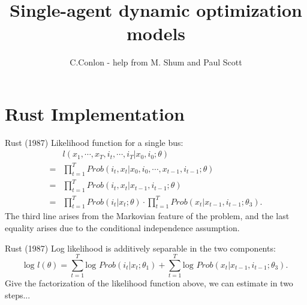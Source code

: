 \documentclass[xcolor=pdftex,dvipsnames,table,mathserif,aspectratio=169]{beamer}
\title [Single-agent dynamic optimization models]{Single-agent dynamic optimization models}
\author{C.Conlon - help from M. Shum and Paul Scott}
\institute{Grad IO }
\date{}
\begin{document}
\begin{frame}
\titlepage
\end{frame}

\section{Rust Implementation}

\begin{frame}{Rust (1987)}
Likelihood function for a single bus:
\begin{equation*}
\begin{split}
& l (x_1, \cdots , x_T, i_t, \cdots , i_T | x_0, i_0 ; \theta) \\
= & \prod^T_{t=1} Prob (i_t, x_t | x_0, i_0, \cdots , x_{t-1}, i_{t-1} ; \theta) \\
= & \prod^T_{t=1} Prob (i_t, x_t |  x_{t-1}, i_{t-1} ; \theta) \\
= & \prod^T_{t=1} Prob (i_t | x_t; \theta) \cdot \prod^T_{t=1} Prob (x_t | x_{t-1}, i_{t-1} ; \theta_3) .
\end{split}
\end{equation*}
The third line arises from the Markovian feature of the problem, and the last equality arises due to the conditional independence assumption. 
\end{frame}

\begin{frame}{Rust (1987)}
Log likelihood is additively separable in the two components:
\begin{equation*}
\text{log } l(\theta) = \sum^T_{t=1} \text{log } Prob (i_t | x_t ; \theta_1) + \sum^T_{t=1} \text{log } Prob (x_t | x_{t-1}, i_{t-1}; \theta_3).
\end{equation*}
Give the factorization of the likelihood function above, we can estimate in two steps... \\
\vspace{3mm}
\end{frame}
\end{document}
